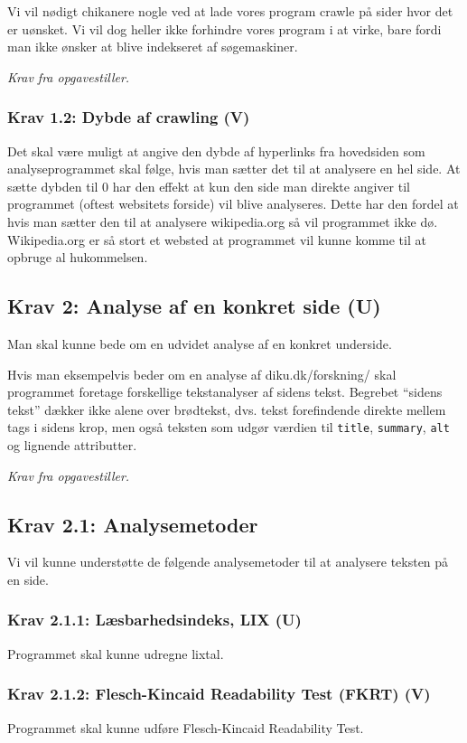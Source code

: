 \documentclass[a4paper,oneside,article]{memoir}
\begin{document}
Vi vil nødigt chikanere nogle ved at lade vores program crawle på
sider hvor det er uønsket. Vi vil dog heller ikke forhindre vores
program i at virke, bare fordi man ikke ønsker at blive indekseret af
søgemaskiner.

\textit{Krav fra opgavestiller.}

\subsubsection{Krav 1.2: Dybde af crawling (V)}
Det skal være muligt at angive den dybde af hyperlinks fra hovedsiden
som analyseprogrammet skal følge, hvis man sætter det til at analysere
en hel side. At sætte dybden til 0 har den effekt at kun den side man
direkte angiver til programmet (oftest websitets forside) vil blive
analyseres. Dette har den fordel at hvis man sætter den til at
analysere wikipedia.org så vil programmet ikke dø. Wikipedia.org er så
stort et websted at programmet vil kunne komme til at opbruge al
hukommelsen.

\subsection{Krav 2: Analyse af en konkret side (U)}
Man skal kunne bede om en udvidet analyse af en konkret underside.

Hvis man eksempelvis beder om en analyse af diku.dk/forskning/ skal
programmet foretage forskellige tekstanalyser af sidens
tekst. Begrebet ``sidens tekst'' dækker ikke alene over brødtekst,
dvs. tekst forefindende direkte mellem tags i sidens krop, men også
teksten som udgør værdien til \texttt{title}, \texttt{summary},
\texttt{alt} og lignende attributter.

\textit{Krav fra opgavestiller.}

\subsection{Krav 2.1: Analysemetoder}
Vi vil kunne understøtte de følgende analysemetoder til at analysere
teksten på en side.

\subsubsection{Krav 2.1.1: Læsbarhedsindeks, LIX (U)}
Programmet skal kunne udregne lixtal.

\subsubsection{Krav 2.1.2: Flesch-Kincaid Readability Test (FKRT) (V)}
Programmet skal kunne udføre Flesch-Kincaid Readability Test.
\end{document}
